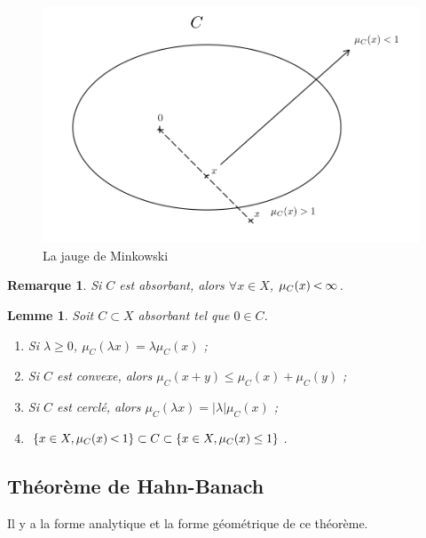 \documentclass[french]{book}
\newtheorem*{remark}{Remarque}
\newtheorem*{lemma}{Lemme}
\newcommand{\lesss}{\rotatebox[origin=c]{90}{$\land$}}
\newcommand{\less}{\ \lesss\ }
\begin{document}
\begin{figure}[h!]
  \centering
  \includegraphics[scale=0.3]{figures/jaugem.png}
  \caption{La jauge de Minkowski}
  \label{}
\end{figure}

\begin{remark}
  Si $C$ est absorbant, alors $\forall x \in X$, $\mu_C(x) \less \infty$.
\end{remark}

\begin{lemma} \label{lemme_mink}
  Soit $C \subset X$ absorbant tel que $0 \in C$.
  \begin{enumerate}
    \item Si $\lambda  \geq 0$, $\mu_C(\lambda x)= \lambda \mu_C(x)$ ;
    \item Si $C$ est convexe, alors $\mu_C(x+y) \leq \mu_C(x)+ \mu_C(y)$ ;
    \item Si $C$ est cerclé, alors $\mu_C(\lambda x) = \lvert \lambda  \rvert \mu_C(x)$ ;
    \item $\{ x \in X, \mu_C(x) \less 1 \} \subset C \subset \{ x \in X, \mu_C(x) \leq 1 \} $.
  \end{enumerate}
\end{lemma}

\subsection{Théorème de Hahn-Banach}

Il y a la forme analytique et la forme géométrique de ce théorème.
\end{document}

